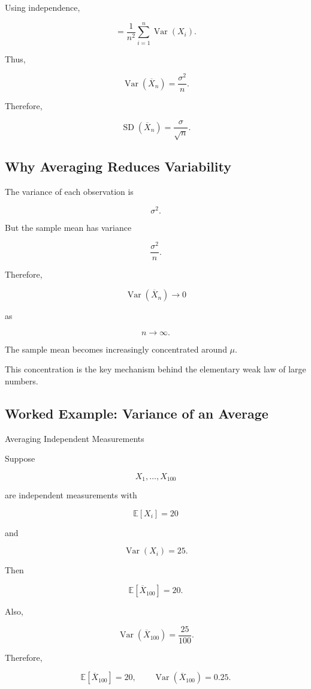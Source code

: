 Using independence,

\[
=
\frac1{n^2}
\sum_{i=1}^{n}
\operatorname{Var}(X_i).
\]

Thus,

\[
\boxed{
\operatorname{Var}(\overline{X}_n)
=
\frac{\sigma^2}{n}.
}
\]

Therefore,

\[
\boxed{
\operatorname{SD}(\overline{X}_n)
=
\frac{\sigma}{\sqrt{n}}.
}
\]

\subsection{Why Averaging Reduces Variability}
\label{subsec:averaging-reduces-variability}

The variance of each observation is

\[
\sigma^2.
\]

But the sample mean has variance

\[
\frac{\sigma^2}{n}.
\]

Therefore,

\[
\boxed{
\operatorname{Var}(\overline{X}_n)
\to0
}
\]

as

\[
n\to\infty.
\]

The sample mean becomes increasingly concentrated around \(\mu\).

This concentration is the key mechanism behind the elementary weak law
of large numbers.

\subsection{Worked Example: Variance of an Average}
\label{subsec:worked-variance-average}

\begin{workedexamplebox}{Averaging Independent Measurements}

Suppose

\[
X_1,\ldots,X_{100}
\]

are independent measurements with

\[
\mathbb{E}[X_i]=20
\]

and

\[
\operatorname{Var}(X_i)=25.
\]

Then

\[
\mathbb{E}[\overline{X}_{100}]
=
20.
\]

Also,

\[
\operatorname{Var}(\overline{X}_{100})
=
\frac{25}{100}.
\]

Therefore,

\begin{answerbox}
\[
\boxed{
\mathbb{E}[\overline{X}_{100}]
=
20,
\qquad
\operatorname{Var}(\overline{X}_{100})
=
0.25.
}
\]
\end{answerbox}

\end{workedexamplebox}

